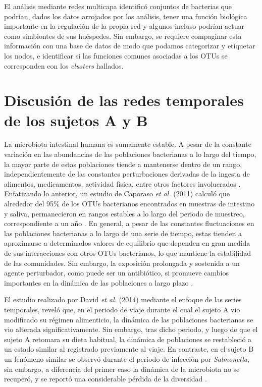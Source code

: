 \documentclass[
]{book}
\begin{document}
El análisis mediante redes multicapa identificó conjuntos de bacterias que podrían, dados los datos arrojados por los análisis, tener una función biológica importante en la regulación de la propia red y algunos incluso podrían actuar como simbiontes de sus huéspedes. Sin embargo, se requiere compaginar esta información con una base de datos de modo que podamos categorizar y etiquetar los nodos, e identificar si las funciones comunes asociadas a los OTUs se corresponden con los \emph{clusters} hallados.

\hypertarget{discusiuxf3n-de-las-redes-temporales-de-los-sujetos-a-y-b}{%
\section*{Discusión de las redes temporales de los sujetos A y B}\label{discusiuxf3n-de-las-redes-temporales-de-los-sujetos-a-y-b}}

La microbiota intestinal humana es sumamente estable. A pesar de la constante variación en las abundancias de las poblaciones bacterianas a lo largo del tiempo, la mayor parte de estas poblaciones tiende a mantenerse dentro de un rango, independientemente de las constantes perturbaciones derivadas de la ingesta de alimentos, medicamentos, actividad física, entre otros factores involucrados \citep{costello2009bacterial}. Enfatizando lo anterior, un estudio de Caporaso \emph{et al.} (2011) calculó que alrededor del 95\% de los OTUs bacterianos encontrados en muestras de intestino y saliva, permanecieron en rangos estables a lo largo del periodo de muestreo, correspondiente a un año \citep{caporaso2011moving}. En general, a pesar de las constantes fluctuaciones en las poblaciones bacterianas a lo largo de una serie de tiempo, estas tienden a aproximarse a determinados valores de equilibrio que dependen en gran medida de sus interacciones con otros OTUs bacterianos, lo que mantiene la estabilidad de las comunidades. Sin embargo, la exposición prolongada y sostenida a un agente perturbador, como puede ser un antibiótico, si promueve cambios importantes en la dinámica de las poblaciones a largo plazo \citep{dethlefsen2011incomplete}.

El estudio realizado por David \emph{et al.} (2014) mediante el enfoque de las series temporales, reveló que, en el periodo de viaje durante el cual el sujeto A vio modificado su régimen alimenticio, la dinámica de las poblaciones bacterianas se vio alterada significativamente. Sin embargo, tras dicho periodo, y luego de que el sujeto A retomara su dieta habitual, la dinámica de poblaciones se restableció a un estado similar al registrado previamente al viaje. En contraste, en el sujeto B un fenómeno similar se observó durante el periodo de infección por \emph{Salmonella}, sin embargo, a diferencia del primer caso la dinámica de la microbiota no se recuperó, y se reportó una considerable pérdida de la diversidad \citep{david2014host}.
\end{document}
